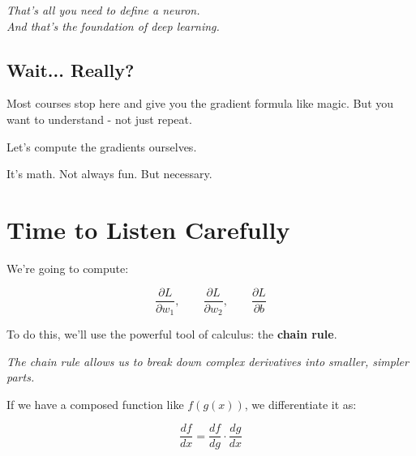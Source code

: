 \documentclass[11pt]{article}
\begin{document}
\vspace{1em}

\begin{tcolorbox}[colback=gray!10, colframe=gray!40!black, sharp corners=southwest, boxrule=0.3mm]
\centering
\textit{That's all you need to define a neuron.}\\
\textit{And that's the foundation of deep learning.}
\end{tcolorbox}


\subsection*{Wait... Really?}

Most courses stop here and give you the gradient formula like magic.  
But you want to understand - not just repeat.

\vspace{0.5em}

Let's compute the gradients ourselves.

It's math. Not always fun. But necessary.

\vspace{1em}

\section*{Time to Listen Carefully}

We're going to compute:

\[
\frac{\partial L}{\partial w_1}, \qquad \frac{\partial L}{\partial w_2}, \qquad \frac{\partial L}{\partial b}
\]

\vspace{1em}

To do this, we'll use the powerful tool of calculus: the \textbf{chain rule}.

\vspace{1em}

\begin{tcolorbox}[colback=gray!7, colframe=gray!50!black, sharp corners=southwest, boxrule=0.3mm]
\centering
\textit{The chain rule allows us to break down complex derivatives into smaller, simpler parts.}
\end{tcolorbox}

\vspace{1em}

If we have a composed function like $f(g(x))$, we differentiate it as:

\[
\frac{df}{dx} = \frac{df}{dg} \cdot \frac{dg}{dx}
\]
\end{document}

